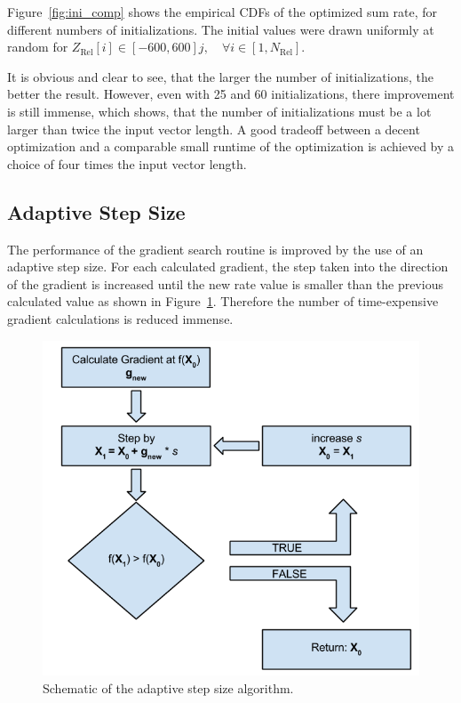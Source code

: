 Figure~\ref{fig:ini_comp} shows the empirical CDFs of the optimized sum rate, for different numbers of initializations.
The initial values were drawn uniformly at random for $Z_{\text{Rel}}[i]\in[-600,600] j , \quad\forall i\in[1,N_{\text{Rel}}]$.

It is obvious and clear to see, that the larger the number of initializations, the better the result.
However, even with 25 and 60 initializations, there improvement is still immense, which shows, that the number of initializations must be a lot larger than twice the input vector length.
A good tradeoff between a decent optimization and a comparable small runtime of the optimization is achieved by a choice of four times the input vector length.

\subsection{Adaptive Step Size}
\label{sec:grads_stepsize}
The performance of the gradient search routine is improved by the use of an adaptive step size.
For each calculated gradient, the step taken into the direction of the gradient is increased until the new rate value is smaller than the previous calculated value as shown in Figure~\ref{fig:stepsize}.
Therefore the number of time-expensive gradient calculations is reduced immense.
\begin{figure}[h]
\centering
  \includegraphics[width=0.5\linewidth]{images/stepsize_scheme.png}
\caption{Schematic of the adaptive step size algorithm.}
\label{fig:stepsize}
\end{figure}


